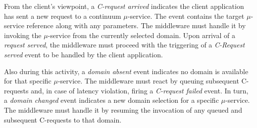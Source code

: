 %
%		
%		
%		

From the client's viewpoint, a \textit{C-request arrived} indicates the client application has sent a new request to a continuum $\mu$-service. The event contains the target $\mu$-service reference along with any parameters. The middleware must handle it by invoking the $\mu$-service from the currently selected domain. Upon arrival of a \textit{request served}, the middleware must proceed with the triggering of a \textit{C-Request served} event to be handled by the client application. 

Also during this activity, a \textit{domain absent} event indicates no domain is available for that specific $\mu$-service. The middleware must react by queuing subsequent C-requests and, in case of latency violation, firing a \textit{C-request failed} event. In turn, a \textit{domain changed} event indicates a new domain selection for a specific $\mu$-service. The middleware must handle it by resuming the invocation of any queued and subsequent C-requests to that domain.

